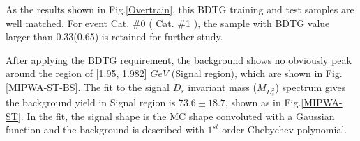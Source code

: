 \par{As the results shown in Fig.\ref{Overtrain}, this BDTG training and test samples are well matched. For event Cat. \#0 ( Cat. \#1 ), the sample with BDTG value larger than 0.33(0.65) is retained for further study. 
    
    
   
    After applying the BDTG requirement, the background shows no obviously peak around the region of [1.95, 1.982] $GeV$ (Signal region), which are shown in Fig.\ref{MIPWA-ST-BS}.  The fit to the signal $D_{s}$ invariant mass ($M_{D_{s}^{2}}$) spectrum gives the background yield in Signal region is $73.6\pm18.7$, shown as in Fig.\ref{MIPWA-ST}. In the fit, the signal shape is the MC shape convoluted with a Gaussian function and the background is described with $1^{st}$-order Chebychev polynomial.


}


